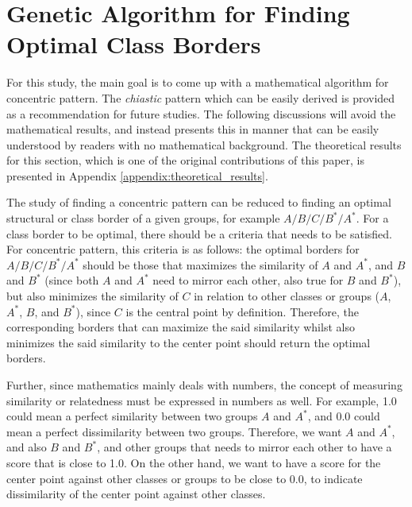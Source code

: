 \section{Genetic Algorithm for Finding Optimal Class Borders}\label{sec:result_ga}
For this study, the main goal is to come up with a mathematical algorithm for concentric pattern. The \textit{chiastic} pattern which can be easily derived is provided as a recommendation for future studies. The following discussions will avoid the mathematical results, and instead presents this in manner that can be easily understood by readers with no mathematical background. The theoretical results for this section, which is one of the original contributions of this paper, is presented in Appendix \ref{appendix:theoretical_results}.

The study of finding a concentric pattern can be reduced to finding an optimal structural or class border of a given groups, for example $A/B/C/B^*/A^*$. For a class border to be optimal, there should be a criteria that needs to be satisfied. For concentric pattern, this criteria is as follows: the optimal borders for $A/B/C/B^*/A^*$ should be those that maximizes the similarity of $A$ and $A^*$, and $B$ and $B^*$ (since both $A$ and $A^*$ need to mirror each other, also true for $B$ and $B^*$), but also minimizes the similarity of $C$ in relation to other classes or groups ($A$, $A^*$, $B$, and $B^*$), since $C$ is the central point by definition. Therefore, the corresponding borders that can maximize the said similarity whilst also minimizes the said similarity to the center point should return the optimal borders. 

Further, since mathematics mainly deals with numbers, the concept of measuring similarity or relatedness must be expressed in numbers as well. For example, 1.0 could mean a perfect similarity between two groups $A$ and $A^*$, and 0.0 could mean a perfect dissimilarity between two groups. Therefore, we want $A$ and $A^*$, and also $B$ and $B^*$, and other groups that needs to mirror each other to have a score that is close to 1.0. On the other hand, we want to have a score for the center point against other classes or groups to be close to 0.0, to indicate dissimilarity of the center point against other classes.

